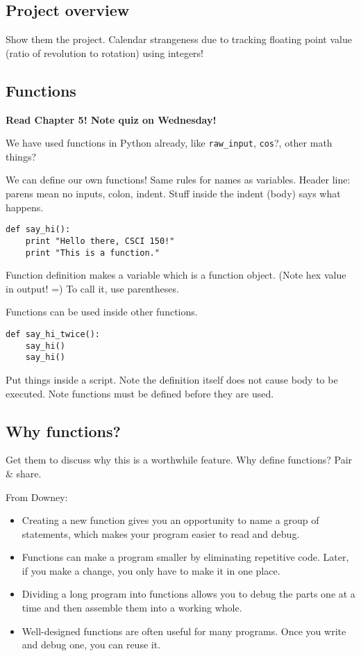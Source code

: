 \documentclass{article}
\begin{document}
\subsection*{Project overview}

Show them the project.  Calendar strangeness due to tracking floating
point value (ratio of revolution to rotation) using integers!

\subsection*{Functions}

\textbf{Read Chapter 5! Note quiz on Wednesday!}

We have used functions in Python already, like \verb|raw_input|,
\verb|cos|?, other math things?

We can define our own functions!  Same rules for names as
variables. Header line: parens mean no inputs, colon, indent.  Stuff
inside the indent (body) says what happens.

\begin{verbatim}
def say_hi():
    print "Hello there, CSCI 150!"
    print "This is a function."
\end{verbatim}

Function definition makes a variable which is a function object. (Note
hex value in output! =) To call it, use parentheses.

Functions can be used inside other functions.

\begin{verbatim}
def say_hi_twice():
    say_hi()
    say_hi()
\end{verbatim}

Put things inside a script.  Note the definition itself does not cause
body to be executed.  Note functions must be defined before they are
used.

\subsection*{Why functions?}

Get them to discuss why this is a worthwhile feature.  Why define
functions?  Pair \& share.

From Downey:

\begin{itemize}
\item Creating a new function gives you an opportunity to name a group
  of statements, which makes your program easier to read and debug.
\item  Functions can make a program smaller by eliminating repetitive code.
  Later, if you make a change, you only have to make it in one place.
\item Dividing a long program into
  functions allows you to debug the parts one at a time and then
  assemble them into a working whole.
\item Well-designed functions are often useful for many programs.
  Once you write and debug one, you can reuse it.
\end{itemize}
\end{document}
